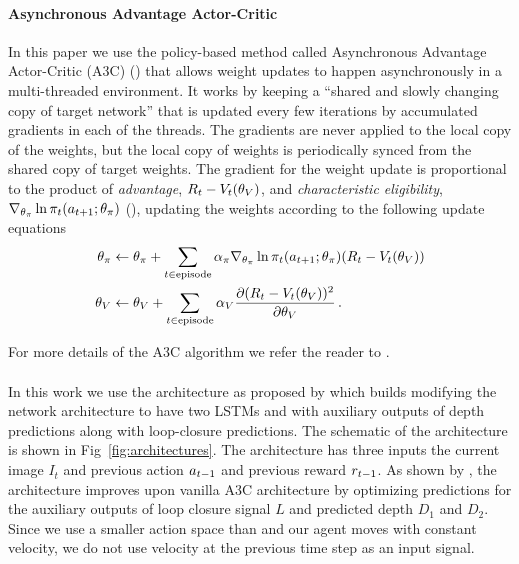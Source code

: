 \paragraph{Asynchronous Advantage Actor-Critic}
\def\charelig{\nabla_{\theta_\pi}\ln \pit(\acttn; \theta_\pi)}
In this paper we use the policy-based method called Asynchronous Advantage Actor-Critic (A3C) (\cite{MnBaMiICML2016}) that allows weight updates to happen asynchronously in a multi-threaded environment.
It works by keeping a ``shared and slowly changing copy of target network'' that is updated every few iterations by accumulated gradients in each of the threads.
The gradients are never applied to the local copy of the weights, but the local copy of weights is periodically synced from the shared copy of target weights.
The gradient for the weight update is proportional to the product of \emph{advantage}, $R_t - V_t(\theta_V)$, and \emph{characteristic eligibility}, $\charelig$ (\cite{WiML1992}), updating the weights according to the following update equations
\begin{align}
  \theta_\pi &\leftarrow \theta_\pi
  + \sum_{t \in \text{episode}}\alpha_\pi \charelig (R_t - \Value_t(\theta_\Value))
  \\
  \theta_\Value &\leftarrow \theta_\Value
  + \sum_{t \in \text{episode}} \alpha_\Value \frac{\partial (R_t - \Value_t(\theta_\Value))^2}
                  {\partial\theta_\Value}
                  \, .
\end{align}

For more details of the A3C algorithm we refer the reader to \cite{MnBaMiICML2016}.
\paragraph{\NavAiiiCDiDiiL{}}
In this work we use the \NavAiiiCDiDiiL{} architecture as proposed by \cite{MiPaViICLR2017} which builds modifying the network architecture to have two LSTMs and with auxiliary outputs of depth predictions along with loop-closure predictions.
The schematic of the architecture is shown in Fig~\ref{fig:architectures}.
The architecture has three inputs the current image $I_t$ and previous action $a_{t-1}$ and previous reward $r_{t-1}$.
As shown by \cite{MiPaViICLR2017}, the architecture improves upon vanilla A3C architecture by optimizing predictions for the auxiliary outputs of loop closure signal $L$ and predicted depth $D_1$ and $D_2$.
Since we use a smaller action space than \cite{MiPaViICLR2017} and our agent moves with constant velocity, we do not use velocity at the previous time step as an input signal.

